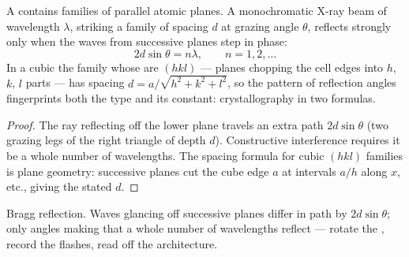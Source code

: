 \begin{proposition}\label{prop:b3:crystalline-solids:bragg}
A  contains families of parallel atomic planes. A
monochromatic X-ray beam of wavelength $\lambda$, striking a family
of spacing $d$ at grazing angle $\theta$, reflects strongly only
when the waves from successive planes step in phase:
\[
2d\sin\theta = n\lambda , \qquad n = 1, 2, \dots
\]
In a cubic  the family whose \emph{} are
$(hkl)$ --- planes chopping the cell edges into $h$, $k$, $l$ parts
--- has spacing $d = a/\sqrt{h^2 + k^2 + l^2}$, so the pattern of
reflection angles fingerprints both the  type and its
constant: crystallography in two formulas.
\end{proposition}

\begin{proof}
The ray reflecting off the lower plane travels an extra path $2d
\sin\theta$ (two grazing legs of the right triangle of depth $d$).
Constructive interference requires it be a whole number of
wavelengths. The spacing formula for cubic $(hkl)$ families is
plane geometry: successive planes cut the cube edge $a$ at
intervals $a/h$ along $x$, etc., giving the stated $d$.
\end{proof}

\begin{omfigure}

{\small Bragg reflection. Waves glancing off successive planes
differ in path by $2d\sin\theta$; only angles making that a whole
number of wavelengths reflect --- rotate the , record the
flashes, read off the architecture.}
\end{omfigure}

